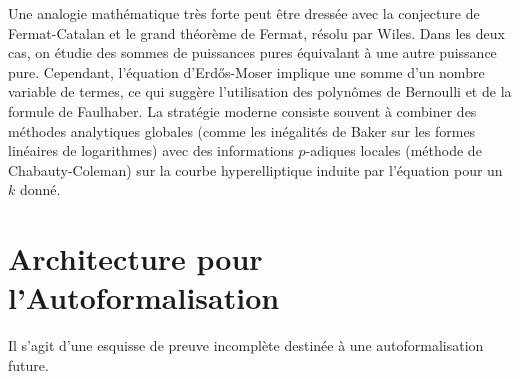\documentclass[11pt,a4paper]{article}
\begin{document}
Une analogie mathématique très forte peut être dressée avec la conjecture de Fermat-Catalan et le grand théorème de Fermat, résolu par Wiles. Dans les deux cas, on étudie des sommes de puissances pures équivalant à une autre puissance pure. Cependant, l'équation d'Erd\H{o}s-Moser implique une somme d'un nombre variable de termes, ce qui suggère l'utilisation des polynômes de Bernoulli et de la formule de Faulhaber. La stratégie moderne consiste souvent à combiner des méthodes analytiques globales (comme les inégalités de Baker sur les formes linéaires de logarithmes) avec des informations $p$-adiques locales (méthode de Chabauty-Coleman) sur la courbe hyperelliptique induite par l'équation pour un $k$ donné.

\section{Architecture pour l'Autoformalisation}

Il s'agit d'une esquisse de preuve incomplète destinée à une autoformalisation future.
\end{document}
